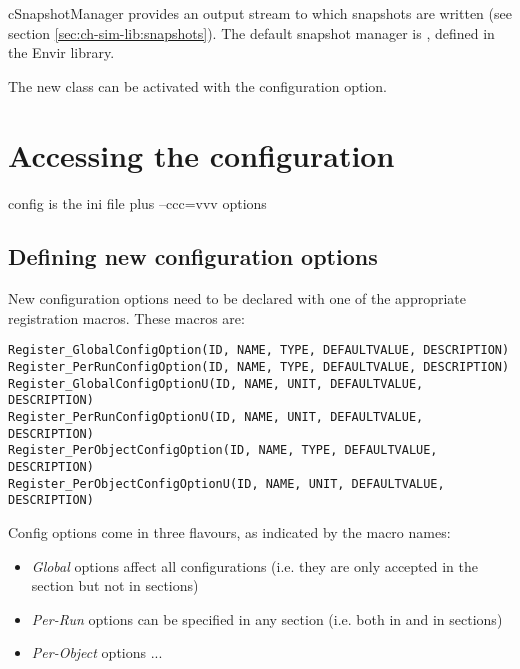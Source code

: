 cSnapshotManager provides an output stream to which snapshots are written
(see section \ref{sec:ch-sim-lib:snapshots}). The default snapshot manager
is , defined in the Envir library.

The new class can be activated with the 
configuration option.


\section{Accessing the configuration}
\label{sec:plugin-exts:accessing-config}

config is the ini file plus --ccc=vvv options

\subsection{Defining new configuration options}

New configuration options need to be declared with one of the appropriate
registration macros. These macros are:

\begin{verbatim}
Register_GlobalConfigOption(ID, NAME, TYPE, DEFAULTVALUE, DESCRIPTION)
Register_PerRunConfigOption(ID, NAME, TYPE, DEFAULTVALUE, DESCRIPTION)
Register_GlobalConfigOptionU(ID, NAME, UNIT, DEFAULTVALUE, DESCRIPTION)
Register_PerRunConfigOptionU(ID, NAME, UNIT, DEFAULTVALUE, DESCRIPTION)
Register_PerObjectConfigOption(ID, NAME, TYPE, DEFAULTVALUE, DESCRIPTION)
Register_PerObjectConfigOptionU(ID, NAME, UNIT, DEFAULTVALUE, DESCRIPTION)
\end{verbatim}

Config options come in three flavours, as indicated by the macro names:

\begin{itemize}
  \item \textit{Global} options affect all configurations (i.e. they are
      only accepted in the \ttt{[General]} section but not in
       sections)
  \item \textit{Per-Run} options can be specified in any section
      (i.e. both in \ttt{[General]} and in  sections)
  \item \textit{Per-Object} options ...
\end{itemize}

